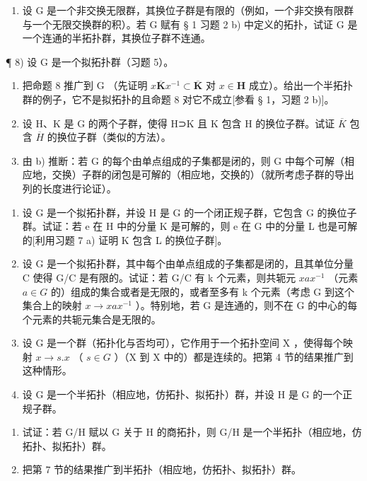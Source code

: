 \begin{enumerate}
\def\labelenumi{\alph{enumi})}
\setcounter{enumi}{1}
\tightlist
\item
  设 G 是一个非交换无限群，其换位子群是有限的（例如，一个非交换有限群与一个无限交换群的积）。若 G 赋有 § 1 习题 2 b) 中定义的拓扑，试证 G 是一个连通的半拓扑群，其换位子群不连通。
\end{enumerate}

¶ 8) 设 G 是一个拟拓扑群（习题 5）。

\begin{enumerate}
\def\labelenumi{\alph{enumi})}
\item
  把命题 8 推广到 G （先证明 \(x\overline{\mathbf{K}}x^{-1} \subset \overline{\mathbf{K}}\) 对 \(x \in \mathbf{H}\) 成立）。给出一个半拓扑群的例子，它不是拟拓扑的且命题 8 对它不成立{[}参看 § 1，习题 2 b){]}。
\item
  设 H、K 是 G 的两个子群，使得 H⊃K 且 K 包含 H 的换位子群。试证 \(\overline{K}\) 包含 \(\overline{H}\) 的换位子群（类似的方法）。
\item
  由 b) 推断：若 G 的每个由单点组成的子集都是闭的，则 G 中每个可解（相应地，交换）子群的闭包是可解的（相应地，交换的）（就所考虑子群的导出列的长度进行论证）。
\end{enumerate}

\begin{enumerate}
\def\labelenumi{\arabic{enumi})}
\setcounter{enumi}{8}
\item
  设 G 是一个拟拓扑群，并设 H 是 G 的一个闭正规子群，它包含 G 的换位子群。试证：若 e 在 H 中的分量 K 是可解的，则 e 在 G 中的分量 L 也是可解的{[}利用习题 7 a) 证明 K 包含 L 的换位子群{]}。
\item
  设 G 是一个拟拓扑群，其中每个由单点组成的子集都是闭的，且其单位分量 C 使得 G/C 是有限的。试证：若 G/C 有 k 个元素，则共轭元 \(xax^{-1}\) （元素 \(a \in G\) 的）组成的集合或者是无限的，或者至多有 k 个元素（考虑 G 到这个集合上的映射 \(x \rightarrow xax^{-1}\) ）。特别地，若 G 是连通的，则不在 G 的中心的每个元素的共轭元集合是无限的。
\item
  设 G 是一个群（拓扑化与否均可），它作用于一个拓扑空间 X ，使得每个映射 \(x \rightarrow s.x\) （ \(s \in G\) ）（X 到 X 中的）都是连续的。把第 4 节的结果推广到这种情形。
\item
  设 G 是一个半拓扑（相应地，仿拓扑、拟拓扑）群，并设 H 是 G 的一个正规子群。
\end{enumerate}

\begin{enumerate}
\def\labelenumi{\alph{enumi})}
\item
  试证：若 G/H 赋以 G 关于 H 的商拓扑，则 G/H 是一个半拓扑（相应地，仿拓扑、拟拓扑）群。
\item
  把第 7 节的结果推广到半拓扑（相应地，仿拓扑、拟拓扑）群。
\end{enumerate}

